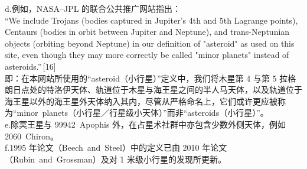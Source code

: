 d.例如，NASA–JPL 的联合公共推广网站指出：\\
``We include Trojans (bodies captured in Jupiter's 4th and 5th Lagrange points), Centaurs (bodies in orbit between Jupiter and Neptune), and trans-Neptunian objects (orbiting beyond Neptune) in our definition of "asteroid" as used on this site, even though they may more correctly be called "minor planets" instead of asteroids.''\,[16]\\
即：在本网站所使用的“asteroid（小行星）”定义中，我们将木星第 4 与第 5 拉格朗日点处的特洛伊天体、轨道位于木星与海王星之间的半人马天体，以及轨道位于海王星以外的海王星外天体纳入其内，尽管从严格命名上，它们或许更应被称为“minor~planets（小行星／行星级小天体）”而非“asteroids（小行星）”。\\
e.除冥王星与 99942~Apophis 外，在占星术社群中亦包含少数外侧天体，例如 2060~Chiron。\\
f.1995 年论文（Beech~and~Steel）中的定义已由 2010 年论文（Rubin~and~Grossman）及对 1 米级小行星的发现所更新。

